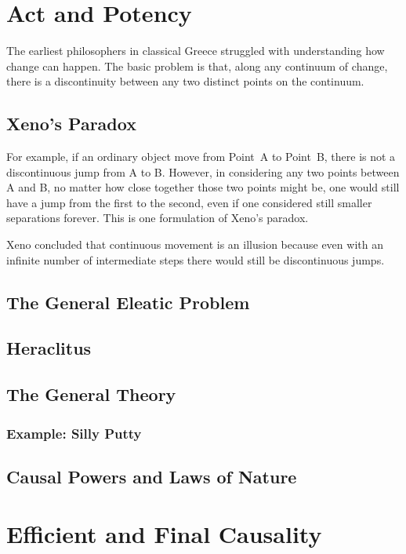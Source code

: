 \documentclass[twocolumn]{article}
\begin{document}
\section{Act and Potency}

The earliest philosophers in classical Greece struggled with understanding how
change can happen.  The basic problem is that, along any continuum of change,
there is a discontinuity between any two distinct points on the continuum.

\subsection{Xeno's Paradox}

For example, if an ordinary object move from Point~A to Point~B, there is not a
discontinuous jump from A to B.  However, in considering any two points between
A and B, no matter how close together those two points might be, one would
still have a jump from the first to the second, even if one considered still
smaller separations forever.  This is one formulation of Xeno's paradox.

Xeno concluded that continuous movement is an illusion because even with an
infinite number of intermediate steps there would still be discontinuous jumps.

\subsection{The General Eleatic Problem}

\subsection{Heraclitus}

\subsection{The General Theory}

\subsubsection{Example: Silly Putty}

\subsection{Causal Powers and Laws of Nature}

\section{Efficient and Final Causality}
\end{document}
